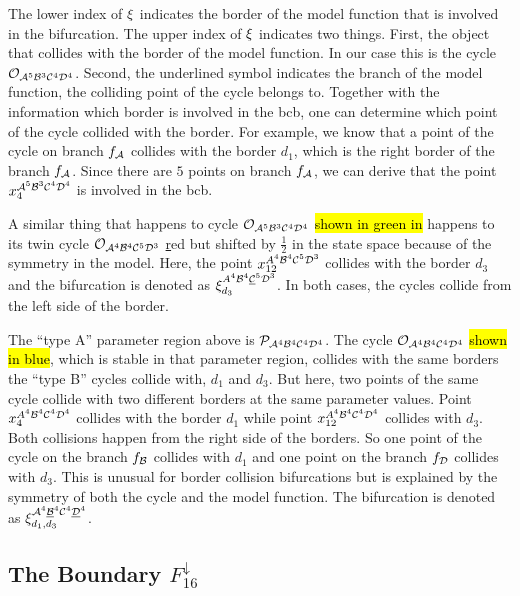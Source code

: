 
The lower index of $\xi$ indicates the border of the model function that is involved in the bifurcation.
The upper index of $\xi$ indicates two things.
First, the object that collides with the border of the model function.
In our case this is the cycle $\mathcal{O}_{\mathcal{A}^5\mathcal{B}^3\mathcal{C}^4\mathcal{D}^4}$.
Second, the underlined symbol indicates the branch of the model function, the colliding point of the cycle belongs to.
Together with the information which border is involved in the \gls{bcb}, one can determine which point of the cycle collided with the border.
For example, we know that a point of the cycle on branch $f_{\mathcal{A}}$ collides with the border $d_1$, which is the right border of the branch $f_{\mathcal{A}}$.
Since there are $5$ points on branch $f_{\mathcal{A}}$, we can derive that the point $x_4^{\mathcal{A}^5\mathcal{B}^3\mathcal{C}^4\mathcal{D}^4}$ is involved in the \gls{bcb}.

A similar thing that happens to cycle $\mathcal{O}_{\mathcal{A}^5\mathcal{B}^3\mathcal{C}^4\mathcal{D}^4}$ \hl{shown in green in}  happens to its twin cycle $\mathcal{O}_{\mathcal{A}^4\mathcal{B}^4\mathcal{C}^5\mathcal{D}^3}$ \href{shown in} red but shifted by $\frac{1}{2}$ in the state space because of the symmetry in the model.
Here, the point $x_{12}^{A^4\mathcal{B}^4\mathcal{C}^5\mathcal{D}^3}$ collides with the border $d_3$ and the bifurcation is denoted as $\xi_{d_3}^{A^4\mathcal{B}^4\underline{\mathcal{C}}^5\mathcal{D}^3}$.
In both cases, the cycles collide from the left side of the border.

The ``type A'' parameter region above is $\mathcal{P}_{\mathcal{A}^4\mathcal{B}^4\mathcal{C}^4\mathcal{D}^4}$.
The cycle $\mathcal{O}_{\mathcal{A}^4\mathcal{B}^4\mathcal{C}^4\mathcal{D}^4}$ \hl{shown in blue}, which is stable in that parameter region, collides with the same borders the ``type B'' cycles collide with, $d_1$ and $d_3$.
But here, two points of the same cycle collide with two different borders at the same parameter values.
Point $x_{4}^{A^4\mathcal{B}^4\mathcal{C}^4\mathcal{D}^4}$ collides with the border $d_1$ while point $x_{12}^{A^4\mathcal{B}^4\mathcal{C}^4\mathcal{D}^4}$ collides with $d_3$.
Both collisions happen from the right side of the borders.
So one point of the cycle on the branch $f_{\mathcal{B}}$ collides with $d_1$ and one point on the branch $f_{\mathcal{D}}$ collides with $d_3$.
This is unusual for border collision bifurcations but is explained by the symmetry of both the cycle and the model function.
The bifurcation is denoted as $\xi_{d_1, d_3}^{\mathcal{A}^4\underline{\mathcal{B}}^4\mathcal{C}^4\underline{\mathcal{D}}^4}$.

\subsection{The Boundary $F_{16}^\downarrow$}
\label{sec:arch.bif.D}

